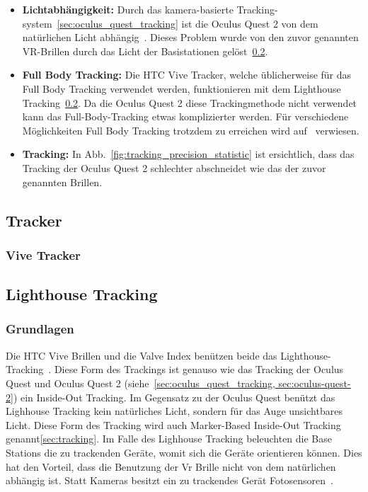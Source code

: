 \begin{itemize}
    \item \textbf{Lichtabhängigkeit:} Durch das kamera-basierte Tracking-system~\ref{sec:oculus_quest_tracking} ist die Oculus Quest 2 von dem natürlichen Licht abhängig~\cite{Dennis_Ziesecke_2019}.
    Dieses Problem wurde von den zuvor genannten VR-Brillen durch das Licht der Basistationen gelöst~\ref{sec:lighthouse_tracking}\cite{Dennis_Ziesecke_2019}.
    \item \textbf{Full Body Tracking:} Die HTC Vive Tracker, welche üblicherweise für das Full Body Tracking verwendet werden, funktionieren mit dem Lighthouse Tracking~\ref{sec:lighthouse_tracking}.
    Da die Oculus Quest 2 diese Trackingmethode nicht verwendet kann das Full-Body-Tracking etwas komplizierter werden.
    Für verschiedene Möglichkeiten Full Body Tracking trotzdem zu erreichen wird auf~\cite{Martin_Rakver} verwiesen.
    \item \textbf{Tracking:} In Abb.~\ref{fig:tracking_precision_statistic} ist ersichtlich, dass das Tracking der Oculus Quest 2 schlechter abschneidet wie das der zuvor genannten Brillen.
\end{itemize}

\subsection{Tracker}\label{sec:tracker}

\subsubsection{Vive Tracker}\label{sec:vive-tracker}

\subsection{Lighthouse Tracking}\label{sec:lighthouse_tracking}

\subsubsection{Grundlagen}

Die HTC Vive Brillen und die Valve Index benützen beide das Lighthouse-Tracking~\cite{steam_lighhouse_versions}.
Diese Form des Trackings ist genauso wie das Tracking der Oculus Quest und Oculus Quest 2 (siehe~\ref{sec:oculus_quest_tracking, sec:oculus-quest-2}) ein Inside-Out Tracking.
Im Gegensatz zu der Oculus Quest benützt das Lighhouse Tracking kein natürliches Licht, sondern für das Auge unsichtbares Licht.
Diese Form des Tracking wird auch Marker-Based Inside-Out Tracking genannt\ref{sec:tracking}.
Im Falle des Lighhouse Tracking beleuchten die Base Stations die zu trackenden Geräte, womit sich die Geräte orientieren können.
Dies hat den Vorteil, dass die Benutzung der Vr Brille nicht von dem natürlichen abhängig ist.
Statt Kameras besitzt ein zu trackendes Gerät Fotosensoren~\cite{Buckley_2015}.

